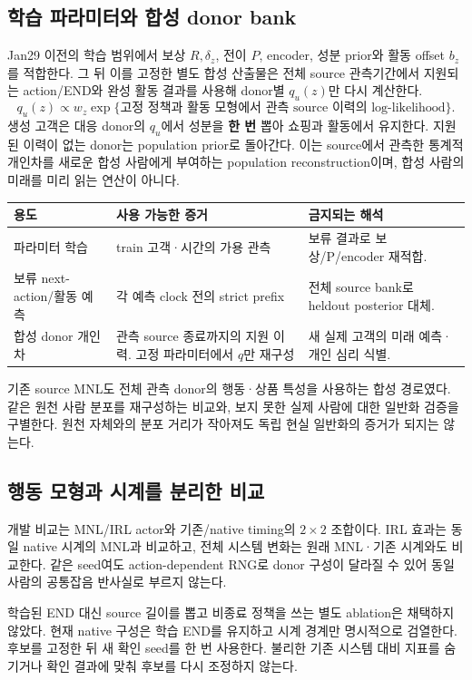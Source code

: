 \documentclass[11pt,a4paper]{article}
\newcommand{\thead}{\rowcolor{pale}}
\begin{document}
\subsection{학습 파라미터와 합성 donor bank}
Jan29 이전의 학습 범위에서 보상 $R,\delta_z$, 전이 $P$, encoder, 성분 prior와 활동 offset $b_z$를 적합한다. 그 뒤 이를 고정한 별도 합성 산출물은 전체 source 관측기간에서 지원되는 action/END와 완성 활동 결과를 사용해 donor별 $q_u(z)$만 다시 계산한다.
\[
q_u(z)\propto w_z\exp\{\text{고정 정책과 활동 모형에서 관측 source 이력의 log-likelihood}\}.
\]
생성 고객은 대응 donor의 $q_u$에서 성분을 \textbf{한 번} 뽑아 쇼핑과 활동에서 유지한다. 지원된 이력이 없는 donor는 population prior로 돌아간다. 이는 source에서 관측한 통계적 개인차를 새로운 합성 사람에게 부여하는 population reconstruction이며, 합성 사람의 미래를 미리 읽는 연산이 아니다.

\begin{tabularx}{\linewidth}{@{}P{.25\linewidth}P{.31\linewidth}Y@{}}\thead 용도 & 사용 가능한 증거 & 금지되는 해석\\\midrule
파라미터 학습 & train 고객·시간의 가용 관측 & 보류 결과로 보상/P/encoder 재적합.\\
보류 next-action/활동 예측 & 각 예측 clock 전의 strict prefix & 전체 source bank로 heldout posterior 대체.\\
합성 donor 개인차 & 관측 source 종료까지의 지원 이력. 고정 파라미터에서 $q$만 재구성 & 새 실제 고객의 미래 예측·개인 심리 식별.\\\bottomrule\end{tabularx}

기존 source MNL도 전체 관측 donor의 행동·상품 특성을 사용하는 합성 경로였다. 같은 원천 사람 분포를 재구성하는 비교와, 보지 못한 실제 사람에 대한 일반화 검증을 구별한다. 원천 자체와의 분포 거리가 작아져도 독립 현실 일반화의 증거가 되지는 않는다.

\subsection{행동 모형과 시계를 분리한 비교}
개발 비교는 MNL/IRL actor와 기존/native timing의 $2\times2$ 조합이다. IRL 효과는 동일 native 시계의 MNL과 비교하고, 전체 시스템 변화는 원래 MNL·기존 시계와도 비교한다. 같은 seed여도 action-dependent RNG로 donor 구성이 달라질 수 있어 동일 사람의 공통잡음 반사실로 부르지 않는다.

학습된 END 대신 source 길이를 뽑고 비종료 정책을 쓰는 별도 ablation은 채택하지 않았다. 현재 native 구성은 학습 END를 유지하고 시계 경계만 명시적으로 검열한다. 후보를 고정한 뒤 새 확인 seed를 한 번 사용한다. 불리한 기존 시스템 대비 지표를 숨기거나 확인 결과에 맞춰 후보를 다시 조정하지 않는다.
\end{document}
